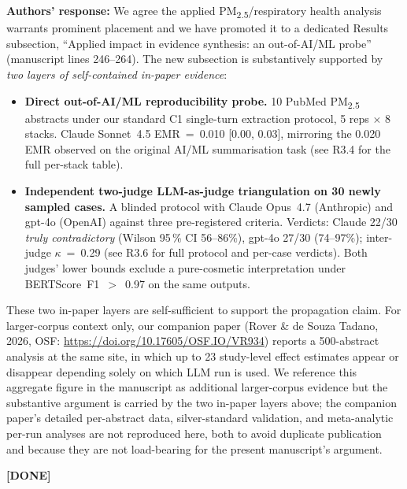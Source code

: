 \documentclass[11pt,a4paper]{article}
\newcommand{\response}[1]{\par\noindent\textbf{\color{revgreen}Authors' response:} #1\par}
\newcommand{\done}{\color{revgreen}\textbf{[DONE]}}
\begin{document}
\response{We agree the applied PM\textsubscript{2.5}/respiratory health analysis warrants prominent placement and we have promoted it to a dedicated Results subsection, ``Applied impact in evidence synthesis: an out-of-AI/ML probe'' (manuscript lines 246--264). The new subsection is substantively supported by \emph{two layers of self-contained in-paper evidence}:

\begin{itemize}[leftmargin=*]
  \item \textbf{Direct out-of-AI/ML reproducibility probe.} 10 PubMed PM\textsubscript{2.5} abstracts under our standard C1 single-turn extraction protocol, 5 reps $\times$ 8 stacks. Claude Sonnet~4.5 EMR~=~0.010 [0.00, 0.03], mirroring the 0.020 EMR observed on the original AI/ML summarisation task (see R3.4 for the full per-stack table).
  \item \textbf{Independent two-judge LLM-as-judge triangulation on 30 newly sampled cases.} A blinded protocol with Claude Opus~4.7 (Anthropic) and gpt-4o (OpenAI) against three pre-registered criteria. Verdicts: Claude 22/30 \emph{truly contradictory} (Wilson 95\,\% CI 56--86\%), gpt-4o 27/30 (74--97\%); inter-judge $\kappa$~=~0.29 (see R3.6 for full protocol and per-case verdicts). Both judges' lower bounds exclude a pure-cosmetic interpretation under BERTScore~F1~$>$~0.97 on the same outputs.
\end{itemize}

These two in-paper layers are self-sufficient to support the propagation claim. For larger-corpus context only, our companion paper (Rover \& de Souza Tadano, 2026, OSF: \url{https://doi.org/10.17605/OSF.IO/VR934}) reports a 500-abstract analysis at the same site, in which up to 23 study-level effect estimates appear or disappear depending solely on which LLM run is used. We reference this aggregate figure in the manuscript as additional larger-corpus evidence but the substantive argument is carried by the two in-paper layers above; the companion paper's detailed per-abstract data, silver-standard validation, and meta-analytic per-run analyses are not reproduced here, both to avoid duplicate publication and because they are not load-bearing for the present manuscript's argument.} \done
\end{document}
